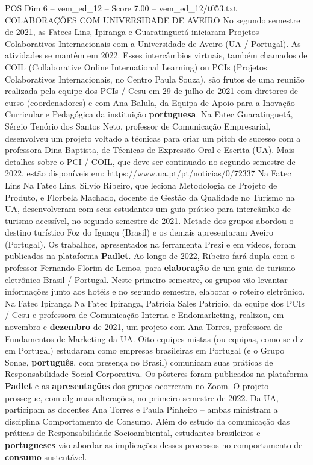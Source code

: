 \begin{textsample}{POS Dim 6 – vem\_ed\_12 – Score 7.00 – vem\_ed\_12/t053.txt}  \label{ex:f6_pos_015}
COLABORAÇÕES COM UNIVERSIDADE DE AVEIRO No segundo semestre de 2021, as Fatecs Lins, Ipiranga e Guaratinguetá iniciaram Projetos Colaborativos Internacionais com a Universidade de Aveiro (UA / Portugal).
As atividades se mantêm em 2022.
Esses intercâmbios virtuais, também chamados de COIL (Collaborative Online International Learning) ou PCIs (Projetos Colaborativos Internacionais, no Centro Paula Souza), são frutos de uma reunião realizada pela equipe dos PCIs / Cesu em 29 de julho de 2021 com diretores de curso (coordenadores) e com Ana Balula, da Equipa de Apoio para a Inovação Curricular e Pedagógica da instituição \textbf{portuguesa}.
Na Fatec Guaratinguetá, Sérgio Tenório dos Santos Neto, professor de Comunicação Empresarial, desenvolveu um projeto voltado a técnicas para criar um pitch de sucesso com a professora Dina Baptista, de Técnicas de Expressão Oral e Escrita (UA).
Mais detalhes sobre o PCI / COIL, que deve ser continuado no segundo semestre de 2022, estão disponíveis em: https://www.ua.pt/pt/noticias/0/72337 Na Fatec Lins Na Fatec Lins, Silvio Ribeiro, que leciona Metodologia de Projeto de Produto, e Florbela Machado, docente de Gestão da Qualidade no Turismo na UA, desenvolveram com seus estudantes um guia prático para intercâmbio de turismo acessível, no segundo semestre de 2021.
Metade dos grupos abordou o destino turístico Foz do Iguaçu (Brasil) e os demais apresentaram Aveiro (Portugal).
Os trabalhos, apresentados na ferramenta Prezi e em vídeos, foram publicados na plataforma \textbf{Padlet}.
Ao longo de 2022, Ribeiro fará dupla com o professor Fernando Florim de Lemos, para \textbf{elaboração} de um guia de turismo eletrônico Brasil / Portugal.
Neste primeiro semestre, os grupos vão levantar informações junto aos hotéis e no segundo semestre, elaborar o roteiro eletrônico.
Na Fatec Ipiranga Na Fatec Ipiranga, Patrícia Sales Patrício, da equipe dos PCIs / Cesu e professora de Comunicação Interna e Endomarketing, realizou, em novembro e \textbf{dezembro} de 2021, um projeto com Ana Torres, professora de Fundamentos de Marketing da UA.
Oito equipes mistas (ou equipas, como se diz em Portugal) estudaram como empresas brasileiras em Portugal (e o Grupo Sonae, \textbf{português}, com presença no Brasil) comunicam suas práticas de Responsabilidade Social Corporativa.
Os pôsteres foram publicados na plataforma \textbf{Padlet} e as \textbf{apresentações} dos grupos ocorreram no Zoom.
O projeto prossegue, com algumas alterações, no primeiro semestre de 2022.
Da UA, participam as docentes Ana Torres e Paula Pinheiro – ambas ministram a disciplina Comportamento de Consumo.
Além do estudo da comunicação das práticas de Responsabilidade Socioambiental, estudantes brasileiros e \textbf{portugueses} vão abordar as implicações desses processos no comportamento de \textbf{consumo} sustentável.

\end{textsample}
